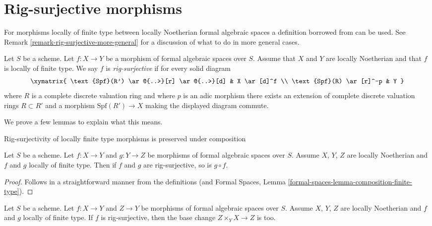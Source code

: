 \section{Rig-surjective morphisms}
\label{section-rig-surjective}

\noindent
For morphisms locally of finite type between locally Noetherian formal
algebraic spaces a definition borrowed from \cite{ArtinII} can be used. See
Remark \ref{remark-rig-surjective-more-general} for a discussion
of what to do in more general cases.

\begin{definition}
\label{definition-rig-surjective}
Let $S$ be a scheme. Let $f : X \to Y$ be a morphism of formal
algebraic spaces over $S$. Assume that $X$ and $Y$ are locally
Noetherian and that $f$ is locally of finite type. We say
$f$ is {\it rig-surjective} if for every solid diagram
$$
\xymatrix{
\text{Spf}(R') \ar@{..>}[r] \ar@{..>}[d] & X \ar[d]^f \\
\text{Spf}(R) \ar[r]^-p & Y
}
$$
where $R$ is a complete discrete valuation ring and where
$p$ is an adic morphism there exists an
extension of complete discrete valuation rings $R \subset R'$
and a morphism $\text{Spf}(R') \to X$ making the displayed diagram commute.
\end{definition}

\noindent
We prove a few lemmas to explain what this means.

\begin{lemma}
\label{lemma-composition-rig-surjective}
\begin{slogan}
Rig-surjectivity of locally finite type morphisms is preserved under
composition
\end{slogan}
Let $S$ be a scheme. Let $f : X \to Y$ and $g : Y \to Z$ be morphisms of formal
algebraic spaces over $S$. Assume $X$, $Y$, $Z$ are locally Noetherian and
$f$ and $g$ locally of finite type. Then if $f$ and $g$ are rig-surjective,
so is $g \circ f$.
\end{lemma}

\begin{proof}
Follows in a straightforward manner from the definitions
(and Formal Spaces, Lemma \ref{formal-spaces-lemma-composition-finite-type}).
\end{proof}

\begin{lemma}
\label{lemma-base-change-rig-surjective}
Let $S$ be a scheme. Let $f : X \to Y$ and $Z \to Y$ be morphisms
of formal algebraic spaces over $S$. Assume $X$, $Y$, $Z$ are locally
Noetherian and $f$ and $g$ locally of finite type. If $f$ is
rig-surjective, then the base change $Z \times_Y X \to Z$ is too.
\end{lemma}

